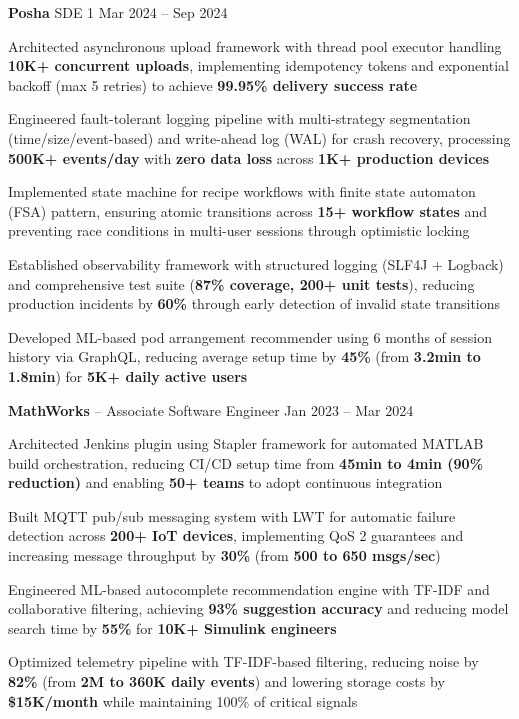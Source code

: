 \documentclass{article}
\newcommand{\employer}[4]{{
\vspace*{2pt}%
\textbf{#1} #2 \hfill #3\\ #4 \vspace*{2pt}}
}
\renewcommand{\labelitemii}{
$\vcenter{\hbox{\tiny$\bullet$}}$\hspace*{-3pt}
}
\newenvironment{bullet-list-minor}{
\begin{list}{\labelitemii}{\setlength\leftmargin{15pt} 
\topsep 0pt \itemsep -2pt}}{\vspace*{4pt}\end{list}
}
\begin{document}
\employer{Posha}{SDE 1}{Mar 2024 -- Sep 2024}{}
\begin{bullet-list-minor}
    \item Architected asynchronous upload framework with thread pool executor handling \textbf{10K+ concurrent uploads}, implementing idempotency tokens and exponential backoff (max 5 retries) to achieve \textbf{99.95\% delivery success rate}
    \item Engineered fault-tolerant logging pipeline with multi-strategy segmentation (time/size/event-based) and write-ahead log (WAL) for crash recovery, processing \textbf{500K+ events/day} with \textbf{zero data loss} across \textbf{1K+ production devices}
    \item Implemented state machine for recipe workflows with finite state automaton (FSA) pattern, ensuring atomic transitions across \textbf{15+ workflow states} and preventing race conditions in multi-user sessions through optimistic locking
    \item Established observability framework with structured logging (SLF4J + Logback) and comprehensive test suite (\textbf{87\% coverage, 200+ unit tests}), reducing production incidents by \textbf{60\%} through early detection of invalid state transitions
    \item Developed ML-based pod arrangement recommender using 6 months of session history via GraphQL, reducing average setup time by \textbf{45\%} (from \textbf{3.2min to 1.8min}) for \textbf{5K+ daily active users}
\end{bullet-list-minor}



\employer{MathWorks}{-- Associate Software Engineer}{Jan 2023 -- Mar 2024}{}
\begin{bullet-list-minor}

    \item Architected Jenkins plugin using Stapler framework for automated MATLAB build orchestration, reducing CI/CD setup time from \textbf{45min to 4min (90\% reduction)} and enabling \textbf{50+ teams} to adopt continuous integration
    \item Built MQTT pub/sub messaging system with LWT for automatic failure detection across \textbf{200+ IoT devices}, implementing QoS 2 guarantees and increasing message throughput by \textbf{30\%} (from \textbf{500 to 650 msgs/sec})
    \item Engineered ML-based autocomplete recommendation engine with TF-IDF and collaborative filtering, achieving \textbf{93\% suggestion accuracy} and reducing model search time by \textbf{55\%} for \textbf{10K+ Simulink engineers}
    \item Optimized telemetry pipeline with TF-IDF-based filtering, reducing noise by \textbf{82\%} (from \textbf{2M to 360K daily events}) and lowering storage costs by \textbf{\$15K/month} while maintaining 100\% of critical signals
\end{bullet-list-minor}
\end{document}
